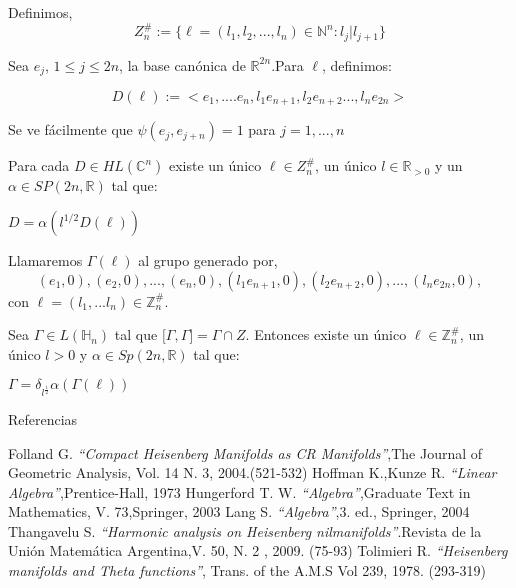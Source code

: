 \documentclass{beamer}
\begin{document}
\begin{frame}
 \begin{example} 
 Definimos,
 $$Z_n^{\#}:= \{ \ell=(l_1,l_2,...,l_n) \in \mathbb{N}^n:l_j|l_{j+1} \}$$
 
 Sea $e_j$, $1\leq j \leq 2n $,  la base canónica de $\mathbb{R}^{2n}$.Para $\ell$, definimos:
 
 $$D(\ell):=<e_1,....e_n,l_1 e_{n+1},l_2 e_{n+2}...,l_n e_{2n}>$$
  
 
 Se ve fácilmente que $\psi(e_j,e_{j+n})=1$ para $j=1,...,n$
\end{example}
\end{frame}

\begin{frame}
 \begin{theorem}
 Para cada $D \in HL(\mathbb{C}^n)$ existe un único $\ell \in Z_n^{\#}$, un único $l \in \mathbb{R}_{>0}$ y un $\alpha \in SP(2n,\mathbb{R})$ tal que:
 
 $D=\alpha(l^{1/2} D(\ell))$
\end{theorem}
\end{frame}

\begin{frame}
 \begin{definition}
 Llamaremos $\Gamma(\ell)$ al grupo generado por,
 $${(e_1,0),(e_2,0),...,(e_n,0),(l_1 e_{n+1},0),(l_2 e_{n+2},0),...,(l_n e_{2n},0)},$$
 con $\ell=(l_1,...l_n) \in \mathbb{Z}_n^{\#}$.
\end{definition}

\begin{corollary}
 Sea $\Gamma \in L(\mathbb{H}_n)$ tal que ${[}\Gamma,\Gamma{]}=\Gamma \cap Z$. Entonces existe un único $\ell \in  \mathbb{Z}_n^{\#}$, un único $l> 0$  y $\alpha \in Sp(2n,\mathbb{R})$ 
 tal que:
 
 $\Gamma = \delta_{l^{\frac{1}{2}}} \alpha (\Gamma(\ell))$
\end{corollary}

\end{frame}









 \begin{frame}{Referencias}
  \begin{thebibliography}{1}
   Folland G.  \emph{``Compact Heisenberg Manifolds as CR Manifolds''},The Journal of Geometric Analysis, Vol. 14 N. 3, 2004.(521-532)
   Hoffman K.,Kunze R.  \emph{``Linear Algebra''},Prentice-Hall, 1973  
   Hungerford T. W.  \emph{``Algebra''},Graduate Text in Mathematics, V. 73,Springer, 2003
   Lang S.  \emph{``Algebra''},3. ed., Springer, 2004
   Thangavelu S.  \emph{``Harmonic analysis on Heisenberg nilmanifolds''}.Revista de la Unión Matemática Argentina,V. 50, N. 2 , 2009. (75-93)
   Tolimieri R.   \emph{``Heisenberg manifolds and Theta functions''}, Trans. of the A.M.S Vol 239, 1978. (293-319)  
  \end{thebibliography}
\end{frame}
\end{document}
